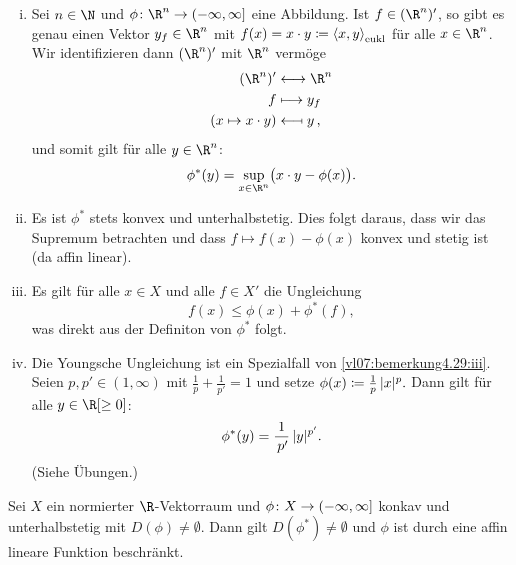 \begin{thBemerkung}\hfill
    \begin{enumerate}[(i)]
        \item 
            Sei $n\in\N$ und $\phi\colon\R^n\to\neginfinfoc$ eine Abbildung.
            Ist $f\in(\R^n)'$, so gibt es genau einen Vektor $y_f\in\R^n$ mit
            $f(x) = x\cdot y \coloneqq \left\langle x,y\right\rangle_{\mathrm{eukl}}$ für alle $x\in\R^n$.
            Wir identifizieren dann $(\R^n)'$ mit $\R^n$ vermöge
            \begin{align*}
                (\R^n)' &\longleftrightarrow \R^n    \\
                f &\longmapsto y_f              \\
                (x\mapsto x\cdot y) &\longmapsfrom y
            \,, \end{align*}
            und somit gilt für alle $y\in\R^n$:
            \[ \phi^\ast(y) = \sup_{x\in\R^n} \bigl( x\cdot y - \phi(x) \bigr)
            . \]
            
        \item
            Es ist $\phi^\ast$ stets konvex und unterhalbstetig. Dies folgt 
            daraus, dass wir das Supremum betrachten und dass
            $f\mapsto f(x)-\phi(x)$ konvex und stetig ist (da affin linear).
            
        \item \label{vl07:bemerkung4.29:iii}
            Es gilt für alle $x\in X$ und alle $f\in X'$ die Ungleichung
            \[ f(x) \leq \phi(x) + \phi^\ast(f)     , \]
            was direkt aus der Definiton von $\phi^\ast$ folgt.
            
        \item
            Die Youngsche Ungleichung 
            ist ein Spezialfall von \ref{vl07:bemerkung4.29:iii}.
            Seien $p,p'\in(1,\infty)$ mit $\frac{1}{p}+\frac{1}{p'}=1$ und setze
            $\phi(x) \coloneqq \frac{1}{p} \, \lvert x\rvert^p  . $
            Dann gilt für alle $y\in\R[\geq0]$:
            \[ \phi^\ast(y) = \frac{1}{\mkern3mu p'} \, \lvert y\rvert^{p'}  . \]
            (Siehe Übungen.)
    \end{enumerate}
\end{thBemerkung}

\begin{thTheorem}
    Sei $X$ ein normierter $\R$-Vektorraum und $\phi\colon X\to(-\infty,\infty]$
    konkav %
    und unterhalbstetig mit $D(\phi)\neq\emptyset$. Dann gilt
    $D(\phi^\ast)\neq\emptyset$ und $\phi$ ist durch eine affin lineare Funktion
    beschränkt.
\end{thTheorem}

